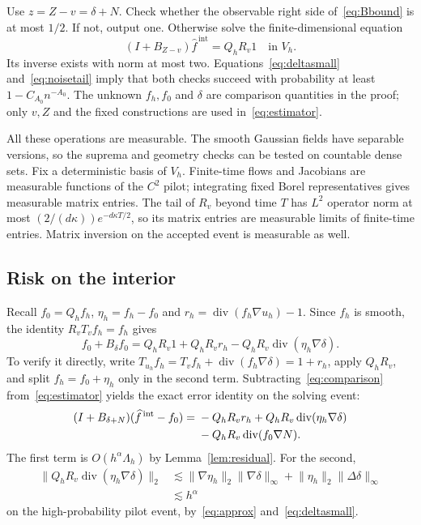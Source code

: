 \documentclass[11pt]{article}
\theoremstyle{remark}
\newcommand{\diver}{\operatorname{div}}
\newcommand{\norm}[1]{\lVert #1\rVert}
\begin{document}
Use $z=Z-v=\delta+N$. Check whether the observable right side of~\eqref{eq:Bbound} is at most $1/2$. If not, output one. Otherwise solve the finite-dimensional equation
\begin{equation}\label{eq:estimator}
 (I+B_{Z-v})\widehat f^{\,\mathrm{int}}=Q_hR_v1
 \quad\text{in }V_h.
\end{equation}
Its inverse exists with norm at most two. Equations~\eqref{eq:deltasmall} and~\eqref{eq:noisetail} imply that both checks succeed with probability at least $1-C_{A_0}n^{-A_0}$. The unknown $f_h,f_0$ and $\delta$ are comparison quantities in the proof; only $v,Z$ and the fixed constructions are used in~\eqref{eq:estimator}.

All these operations are measurable. The smooth Gaussian fields have separable versions, so the suprema and geometry checks can be tested on countable dense sets. Fix a deterministic basis of $V_h$. Finite-time flows and Jacobians are measurable functions of the $C^2$ pilot; integrating fixed Borel representatives gives measurable matrix entries. The tail of $R_v$ beyond time $T$ has $L^2$ operator norm at most
$(2/(d\kappa))e^{-d\kappa T/2}$, so its matrix entries are measurable limits of finite-time entries. Matrix inversion on the accepted event is measurable as well.

\subsection{Risk on the interior}
Recall $f_0=Q_hf_h$, $\eta_h=f_h-f_0$ and $r_h=\diver(f_h\nabla u_h)-1$. Since $f_h$ is smooth, the identity $R_vT_vf_h=f_h$ gives
\begin{equation}\label{eq:comparison}
 f_0+B_\delta f_0
 =Q_hR_v1+Q_hR_vr_h
    -Q_hR_v\diver(\eta_h\nabla\delta).
\end{equation}
To verify it directly, write
$T_{u_h}f_h=T_vf_h+\diver(f_h\nabla\delta)=1+r_h$, apply $Q_hR_v$, and split $f_h=f_0+\eta_h$ only in the second term. Subtracting~\eqref{eq:comparison} from~\eqref{eq:estimator} yields the exact error identity on the solving event:
\begin{align}
 (I+B_{\delta+N})(\widehat f^{\,\mathrm{int}}-f_0)
 ={}&-Q_hR_vr_h+Q_hR_v\diver(\eta_h\nabla\delta)\notag\\
 &-Q_hR_v\diver(f_0\nabla N).
 \label{eq:erroridentity}
\end{align}
The first term is $O(h^\alpha\Lambda_h)$ by Lemma~\ref{lem:residual}. For the second,
\begin{align*}
 \norm{Q_hR_v\diver(\eta_h\nabla\delta)}_2
 &\lesssim\norm{\nabla\eta_h}_2\norm{\nabla\delta}_\infty
       +\norm{\eta_h}_2\norm{\Delta\delta}_\infty\\
 &\lesssim h^\alpha
\end{align*}
on the high-probability pilot event, by~\eqref{eq:approx} and~\eqref{eq:deltasmall}.
\end{document}
